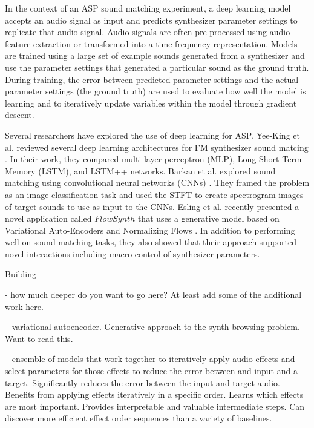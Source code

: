 In the context of an ASP sound matching experiment, a deep learning model accepts an audio signal as input and predicts synthesizer parameter settings to replicate that audio signal. Audio signals are often pre-processed using audio feature extraction or transformed into a time-frequency representation. Models are trained using a large set of example sounds generated from a synthesizer and use the parameter settings that generated a particular sound as the ground truth. During training, the error between predicted parameter settings and the actual parameter settings (the ground truth) are used to evaluate how well the model is learning and to iteratively update variables within the model through gradient descent. 

Several researchers have explored the use of deep learning for ASP. Yee-King et al. reviewed several deep learning architectures for FM synthesizer sound matcing \cite{yee2018automatic}. In their work, they compared multi-layer perceptron (MLP), Long Short Term Memory (LSTM), and LSTM++ networks. Barkan et al. explored sound matching using convolutional neural networks (CNNs) \cite{barkan2019deep, barkan2019inversynth}. They framed the problem as an image classification task and used the STFT to create spectrogram images of target sounds to use as input to the CNNs. Esling et al. recently presented a novel application called $FlowSynth$ that uses a generative model based on Variational Auto-Encoders and Normalizing Flows \cite{esling2020flow}. In addition to performing well on sound matching tasks, they also showed that their approach supported novel interactions including macro-control of synthesizer parameters.

Building 

- how much deeper do you want to go here? At least add some of the additional work here.

\cite{le2021improving} -- variational autoencoder. Generative approach to the synth browsing problem. Want to read this.

\cite{mitcheltree2021serumrnn} -- ensemble of models that work together to iteratively apply audio effects and select parameters for those effects to reduce the error between and input and a target. Significantly reduces the error between the input and target audio. Benefits from applying effects iteratively in a specific order. Learns which effects are most important. Provides interpretable and valuable intermediate steps. Can discover more efficient effect order sequences than a variety of baselines.


